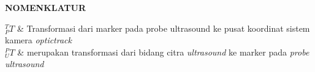 \begin{center}
\Large\textbf{NOMENKLATUR}
\end{center}
\vspace{1ex}
\begin{conditions}
		$_{P}^{T}T$ & Transformasi dari marker pada probe ultrasound ke pusat koordinat sistem kamera \textit{optictrack} \\
		$_{U}^{P}T$ & merupakan transformasi dari bidang citra \textit{ultrasound} ke marker pada \textit{probe ultrasound} \\
		
\end{conditions}
\newpage
